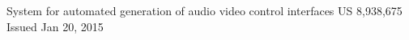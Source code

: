 

\begin{cventries}
  \cventry
    {System for automated generation of audio video control interfaces} %
	{US 8,938,675 Issued Jan 20, 2015} %
    {}
    {}
	{}
\end{cventries}
